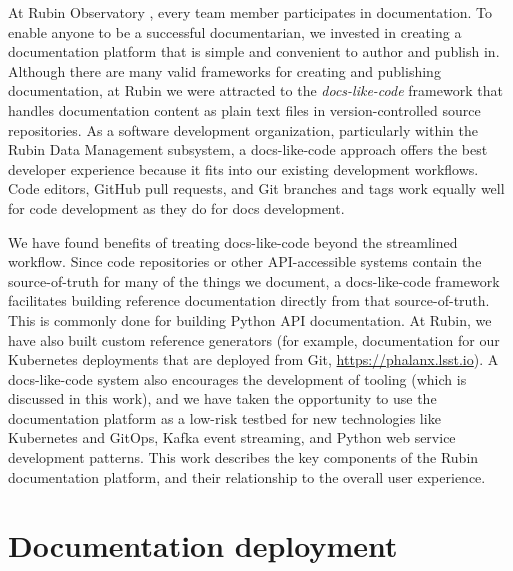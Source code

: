 \documentclass[11pt,twoside]{article}
\begin{document}

At Rubin Observatory \citep{2019ApJ...873..111I}, every team member participates in documentation.
To enable anyone to be a successful documentarian, we invested in creating a documentation platform that is simple and convenient to author and publish in.
Although there are many valid frameworks for creating and publishing documentation, at Rubin we were attracted to the \emph{docs-like-code} \citep{Gentle2022} framework that handles documentation content as plain text files in version-controlled source repositories.
As a software development organization, particularly within the Rubin Data Management subsystem, a docs-like-code approach offers the best developer experience because it fits into our existing development workflows.
Code editors, GitHub pull requests, and Git branches and tags work equally well for code development as they do for docs development.

We have found benefits of treating docs-like-code beyond the streamlined workflow.
Since code repositories or other API-accessible systems contain the source-of-truth for many of the things we document, a docs-like-code framework facilitates building reference documentation directly from that source-of-truth.
This is commonly done for building Python API documentation.
At Rubin, we have also built custom reference generators (for example, documentation for our Kubernetes deployments that are deployed from Git, \url{https://phalanx.lsst.io}).
A docs-like-code system also encourages the development of tooling (which is discussed in this work), and we have taken the opportunity to use the documentation platform as a low-risk testbed for new technologies like Kubernetes and GitOps, Kafka event streaming, and Python web service development patterns.
This work describes the key components of the Rubin documentation platform, and their relationship to the overall user experience.

\section{Documentation deployment}

\end{document}
